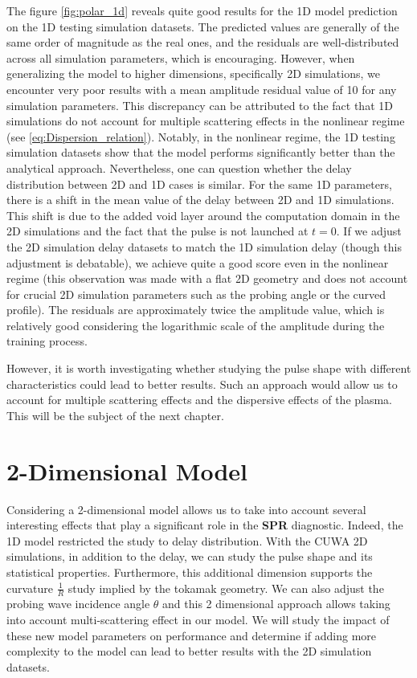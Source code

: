 \documentclass[11pt,a4paper,openany]{report}
\begin{document}
\begin{multicols}{2}
    The figure \ref{fig:polar_1d} reveals quite good results for the 1D model prediction on the 1D testing simulation datasets. The predicted values are generally of the same order of magnitude as the real ones, and the residuals are well-distributed across all simulation parameters, which is encouraging. However, when generalizing the model to higher dimensions, specifically 2D simulations, we encounter very poor results with a mean amplitude residual value of 10 for any simulation parameters. This discrepancy can be attributed to the fact that 1D simulations do not account for multiple scattering effects in the nonlinear regime (see \ref{eq:Dispersion_relation}). Notably, in the nonlinear regime, the 1D testing simulation datasets show that the model performs significantly better than the analytical approach. Nevertheless, one can question whether the delay distribution between 2D and 1D cases is similar. For the same 1D parameters, there is a shift in the mean value of the delay between 2D and 1D simulations. This shift is due to the added void layer around the computation domain in the 2D simulations \cite{SPR_Krutkin} and the fact that the pulse is not launched at $t=0$. If we adjust the 2D simulation delay datasets to match the 1D simulation delay (though this adjustment is debatable), we achieve quite a good score even in the nonlinear regime (this observation was made with a flat 2D geometry and does not account for crucial 2D simulation parameters such as the probing angle or the curved profile). The residuals are approximately twice the amplitude value, which is relatively good considering the logarithmic scale of the amplitude during the training process.

    However, it is worth investigating whether studying the pulse shape with different characteristics could lead to better results. Such an approach would allow us to account for multiple scattering effects and the dispersive effects of the plasma. This will be the subject of the next chapter.

    \chapter{2-Dimensional Model}

    Considering a 2-dimensional model allows us to take into account several interesting effects that play a significant role in the \textbf{SPR} diagnostic. Indeed, the 1D model restricted the study to delay distribution. With the CUWA 2D simulations, in addition to the delay, we can study the pulse shape and its statistical properties. Furthermore, this additional dimension supports the curvature $\frac{1}{R}$ study implied by the tokamak geometry. We can also adjust the probing wave incidence angle $\theta$ and this 2 dimensional approach allows taking into account multi-scattering effect in our model. We will study the impact of these new model parameters on performance and determine if adding more complexity to the model can lead to better results with the 2D simulation datasets.


\end{multicols}
\end{document}
